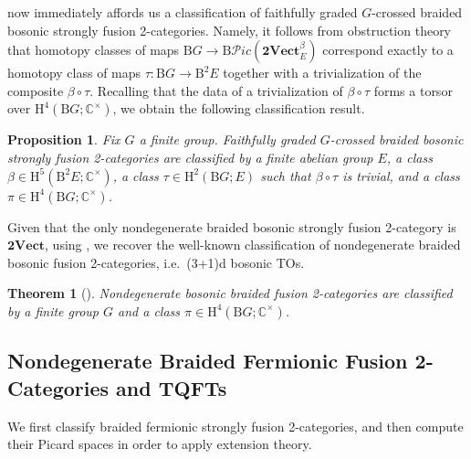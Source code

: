 \documentclass[11pt,reqno]{amsart}
\newcommand{\tVect}{\mathbf{2Vect}}
\newcommand{\sPic}{\mathscr{P}ic}
\newcommand{\rH}{\mathrm{H}}
\newcommand{\rB}{\mathrm{B}}
\numberwithin{equation}{section}
\theoremstyle{plain}
\newtheorem{thm}[equation]{Theorem}
\newtheorem{prop}[equation]{Proposition}
\theoremstyle{definition}
\begin{document}
 now immediately affords us a classification of faithfully graded $G$-crossed braided bosonic strongly fusion 2-categories. Namely, it follows from obstruction theory that homotopy classes of maps $\rB G\rightarrow \rB \sPic(\tVect^\beta_{E})$ correspond exactly to a homotopy class of maps $\tau: \rB G \to \rB^2 E$ together with a trivialization of the composite $\beta \circ \tau$. Recalling that the data of a trivialization of $\beta \circ \tau $ forms a torsor over $\rH^4(\rB G;\mathbb C^\times)$, we obtain the following classification result.

\begin{prop}\label{thm:AllBoson}
Fix $G$ a finite group. Faithfully graded $G$-crossed braided bosonic strongly fusion 2-categories are classified by a finite abelian group $E$, a class $\beta \in \rH^5(\rB^2 E;\mathbb C^\times )$, a class $\tau \in \rH^2(\rB G;E)$ such that $\beta \circ \tau$ is trivial, and a class $\pi \in \rH^4(\rB G;\mathbb C^\times)$.
\end{prop}

Given that the only nondegenerate braided bosonic strongly fusion 2-category is $\mathbf{2Vect}$, using , we recover the well-known classification of nondegenerate braided bosonic fusion 2-categories, i.e.\ (3+1)d bosonic TOs. 

\begin{thm}[\cite{Lan_2018,JF}]\label{BosonicNondegen}
    Nondegenerate bosonic braided fusion 2-categories are classified by a finite group $G$ and a class $\pi \in \rH^4(\rB G; \mathbb{C}^\times)$.
\end{thm}



\subsection{Nondegenerate Braided Fermionic Fusion 2-Categories and TQFTs}\label{subsection:FBF2C}
We first classify braided fermionic strongly fusion 2-categories, and then compute their Picard spaces in order to apply extension theory.
\end{document}

